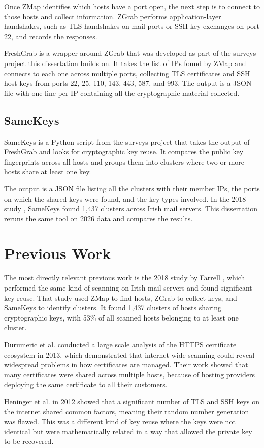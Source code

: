 Once ZMap identifies which hosts have a port open, the next step is to connect to those hosts and collect information. ZGrab performs application-layer handshakes, such as TLS handshakes on mail ports or SSH key exchanges on port 22, and records the responses.

FreshGrab is a wrapper around ZGrab that was developed as part of the surveys project this dissertation builds on. It takes the list of IPs found by ZMap and connects to each one across multiple ports, collecting TLS certificates and SSH host keys from ports 22, 25, 110, 143, 443, 587, and 993. The output is a JSON file with one line per IP containing all the cryptographic material collected.

\subsection{SameKeys}

SameKeys is a Python script from the surveys project that takes the output of FreshGrab and looks for cryptographic key reuse. It compares the public key fingerprints across all hosts and groups them into clusters where two or more hosts share at least one key.

The output is a JSON file listing all the clusters with their member IPs, the ports on which the shared keys were found, and the key types involved. In the 2018 study \cite{cryptoeprint:2018/299}, SameKeys found 1,437 clusters across Irish mail servers. This dissertation reruns the same tool on 2026 data and compares the results.

\section{Previous Work}

The most directly relevant previous work is the 2018 study by Farrell \cite{cryptoeprint:2018/299}, which performed the same kind of scanning on Irish mail servers and found significant key reuse. That study used ZMap to find hosts, ZGrab to collect keys, and SameKeys to identify clusters. It found 1,437 clusters of hosts sharing cryptographic keys, with 53\% of all scanned hosts belonging to at least one cluster.

Durumeric et al. \cite{durumeric2013analysis} conducted a large scale analysis of the HTTPS certificate ecosystem in 2013, which demonstrated that internet-wide scanning could reveal widespread problems in how certificates are managed. Their work showed that many certificates were shared across multiple hosts, because of hosting providers deploying the same certificate to all their customers.

Heninger et al. \cite{heninger2012mining} in 2012 showed that a significant number of TLS and SSH keys on the internet shared common factors, meaning their random number generation was flawed. This was a different kind of key reuse where the keys were not identical but were mathematically related in a way that allowed the private key to be recovered.